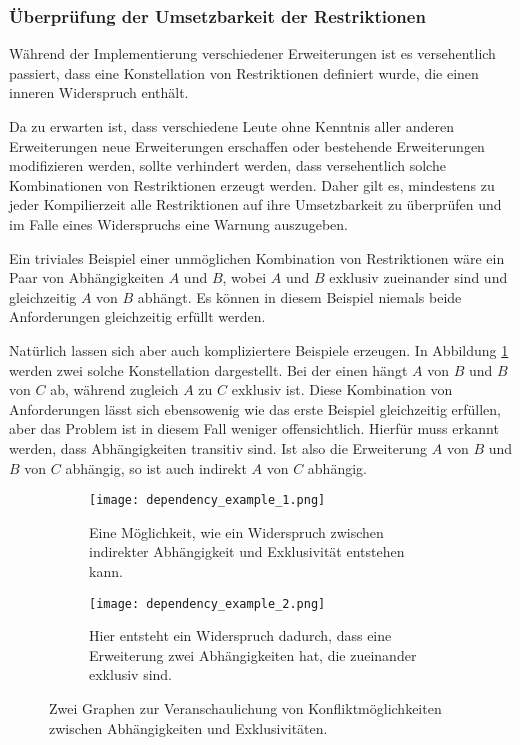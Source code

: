 \subsubsection{Überprüfung der Umsetzbarkeit der Restriktionen}
Während  der Implementierung verschiedener Erweiterungen ist es versehentlich passiert, dass eine Konstellation von Restriktionen definiert wurde, die einen inneren Widerspruch enthält.

Da zu erwarten ist, dass verschiedene Leute ohne Kenntnis aller anderen Erweiterungen neue Erweiterungen erschaffen oder bestehende Erweiterungen modifizieren werden, sollte verhindert werden, dass versehentlich solche Kombinationen von Restriktionen erzeugt werden. Daher gilt es, mindestens zu jeder Kompilierzeit alle Restriktionen auf ihre Umsetzbarkeit zu überprüfen und im Falle eines Widerspruchs eine Warnung auszugeben.

Ein triviales Beispiel einer unmöglichen Kombination von Restriktionen wäre ein Paar von Abhängigkeiten $A$ und $B$, wobei $A$ und $B$ exklusiv zueinander sind und gleichzeitig $A$ von $B$ abhängt. Es können in diesem Beispiel niemals beide Anforderungen gleichzeitig erfüllt werden.

Natürlich lassen sich aber auch kompliziertere Beispiele erzeugen. In Abbildung \ref{fig:impl:dependency_conflict_examples} werden zwei solche Konstellation dargestellt. Bei der einen hängt $A$ von $B$ und $B$ von $C$ ab, während zugleich $A$ zu $C$ exklusiv ist. Diese Kombination von Anforderungen lässt sich ebensowenig wie das erste Beispiel gleichzeitig erfüllen, aber das Problem ist in diesem Fall weniger offensichtlich. Hierfür muss erkannt werden, dass Abhängigkeiten transitiv sind. Ist also die Erweiterung $A$ von $B$ und $B$ von $C$ abhängig, so ist auch indirekt $A$ von $C$ abhängig.

  \begin{figure}
		\centering
		\begin{subfigure}[a]{0.4\linewidth}
			\texttt{[image: dependency\_example\_1.png]}
      		\caption{Eine Möglichkeit, wie ein Widerspruch zwischen indirekter Abhängigkeit und Exklusivität entstehen kann.}
		\end{subfigure}
		\begin{subfigure}[a]{0.4\linewidth}
			\texttt{[image: dependency\_example\_2.png]}
      		\caption{Hier entsteht ein Widerspruch dadurch, dass eine Erweiterung zwei Abhängigkeiten hat, die zueinander exklusiv sind.}
		\end{subfigure}
		\caption{Zwei Graphen zur Veranschaulichung von Konfliktmöglichkeiten zwischen Abhängigkeiten und Exklusivitäten.}
		\label{fig:impl:dependency_conflict_examples}
  \end{figure}

